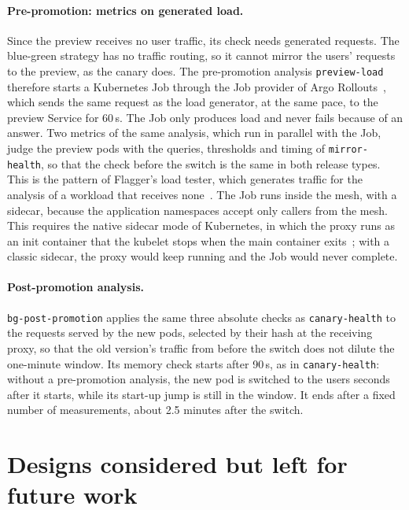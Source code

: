 \paragraph{Pre-promotion: metrics on generated load.} Since the preview receives no user traffic, its check needs generated requests. The blue-green strategy has no traffic routing, so it cannot mirror the users' requests to the preview, as the canary does. The pre-promotion analysis \texttt{preview-load} therefore starts a Kubernetes Job through the Job provider of Argo Rollouts~\cite{ArgoRolloutsJob}, which sends the same request as the load generator, at the same pace, to the preview Service for 60\,s. The Job only produces load and never fails because of an answer. Two metrics of the same analysis, which run in parallel with the Job, judge the preview pods with the queries, thresholds and timing of \texttt{mirror-health}, so that the check before the switch is the same in both release types. This is the pattern of Flagger's load tester, which generates traffic for the analysis of a workload that receives none~\cite{FlaggerWebhooks}. The Job runs inside the mesh, with a sidecar, because the application namespaces accept only callers from the mesh. This requires the native sidecar mode of Kubernetes, in which the proxy runs as an init container that the kubelet stops when the main container exits~\cite{K8sSidecar}; with a classic sidecar, the proxy would keep running and the Job would never complete.

\paragraph{Post-promotion analysis.} \texttt{bg-post-promotion} applies the same three absolute checks as \texttt{canary-health} to the requests served by the new pods, selected by their hash at the receiving proxy, so that the old version's traffic from before the switch does not dilute the one-minute window. Its memory check starts after 90\,s, as in \texttt{canary-health}: without a pre-promotion analysis, the new pod is switched to the users seconds after it starts, while its start-up jump is still in the window. It ends after a fixed number of measurements, about 2.5 minutes after the switch.

\section{Designs considered but left for future work}
\label{sec:DesignRejected}
